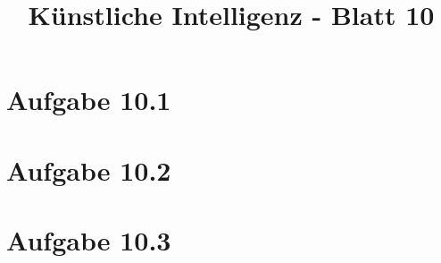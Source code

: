 \documentclass[german,a4paper]{scrartcl}
\title{Künstliche Intelligenz - Blatt 10}
\date{}
\begin{document}
	\maketitle
	\section*{Aufgabe 10.1}
	
	
	\section*{Aufgabe 10.2}
	
	
	\section*{Aufgabe 10.3}
	
\end{document}
